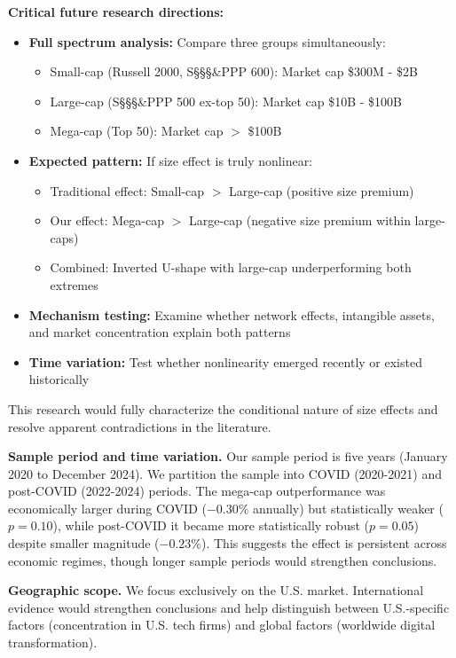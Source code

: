 \documentclass[10pt,letterpaper]{article}
\begin{document}
\textbf{Critical future research directions:}
\begin{itemize}
\item \textbf{Full spectrum analysis:} Compare three groups simultaneously:
  \begin{itemize}
  \item Small-cap (Russell 2000, S\S\S\S\&PPP 600): Market cap \$300M - \$2B
  \item Large-cap (S\S\S\S\&PPP 500 ex-top 50): Market cap \$10B - \$100B
  \item Mega-cap (Top 50): Market cap $>$ \$100B
  \end{itemize}
\item \textbf{Expected pattern:} If size effect is truly nonlinear:
  \begin{itemize}
  \item Traditional effect: Small-cap $>$ Large-cap (positive size premium)
  \item Our effect: Mega-cap $>$ Large-cap (negative size premium within large-caps)
  \item Combined: Inverted U-shape with large-cap underperforming both extremes
  \end{itemize}
\item \textbf{Mechanism testing:} Examine whether network effects, intangible assets, and market concentration explain both patterns
\item \textbf{Time variation:} Test whether nonlinearity emerged recently or existed historically
\end{itemize}

This research would fully characterize the conditional nature of size effects and resolve apparent contradictions in the literature.

\textbf{Sample period and time variation.} Our sample period is five years (January 2020 to December 2024). We partition the sample into COVID (2020-2021) and post-COVID (2022-2024) periods. The mega-cap outperformance was economically larger during COVID ($-0.30\%$ annually) but statistically weaker ($p=0.10$), while post-COVID it became more statistically robust ($p=0.05$) despite smaller magnitude ($-0.23\%$). This suggests the effect is persistent across economic regimes, though longer sample periods would strengthen conclusions.

\textbf{Geographic scope.} We focus exclusively on the U.S. market. International evidence would strengthen conclusions and help distinguish between U.S.-specific factors (concentration in U.S. tech firms) and global factors (worldwide digital transformation).
\end{document}
